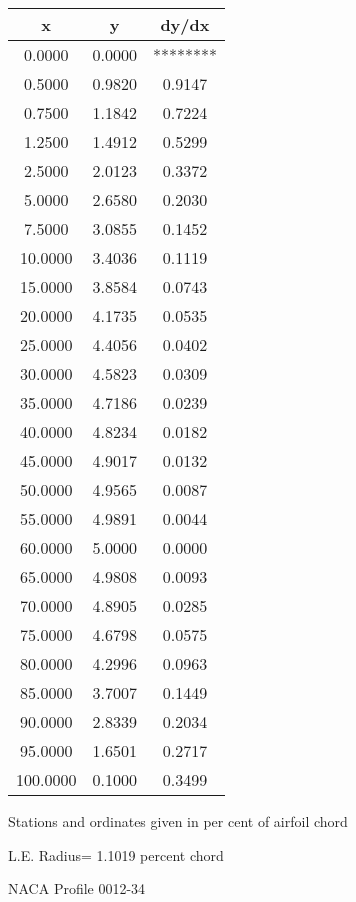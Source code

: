 \documentclass[11pt]{book}
\begin{document}
 \vspace{8mm}
 \begin{tabular}{|c|c|c|} \hline 
  x  &  y  &  dy/dx \\
 \hline
0.0000 & 0.0000 & ******** \\
0.5000 & 0.9820 & 0.9147 \\
0.7500 & 1.1842 & 0.7224 \\
1.2500 & 1.4912 & 0.5299 \\
2.5000 & 2.0123 & 0.3372 \\
5.0000 & 2.6580 & 0.2030 \\
7.5000 & 3.0855 & 0.1452 \\
10.0000 & 3.4036 & 0.1119 \\
15.0000 & 3.8584 & 0.0743 \\
20.0000 & 4.1735 & 0.0535 \\
25.0000 & 4.4056 & 0.0402 \\
30.0000 & 4.5823 & 0.0309 \\
35.0000 & 4.7186 & 0.0239 \\
40.0000 & 4.8234 & 0.0182 \\
45.0000 & 4.9017 & 0.0132 \\
50.0000 & 4.9565 & 0.0087 \\
55.0000 & 4.9891 & 0.0044 \\
60.0000 & 5.0000 & 0.0000 \\
65.0000 & 4.9808 & 0.0093 \\
70.0000 & 4.8905 & 0.0285 \\
75.0000 & 4.6798 & 0.0575 \\
80.0000 & 4.2996 & 0.0963 \\
85.0000 & 3.7007 & 0.1449 \\
90.0000 & 2.8339 & 0.2034 \\
95.0000 & 1.6501 & 0.2717 \\
100.0000 & 0.1000 & 0.3499 \\
 \hline
 \end{tabular}
 \vspace{8mm}


Stations and ordinates given in per cent of airfoil chord 


L.E. Radius=  1.1019 percent chord
 \newpage
  \label{p0012-34}
 \begin{Large}
 NACA Profile 0012-34
 \end{Large}
  
\end{document}
